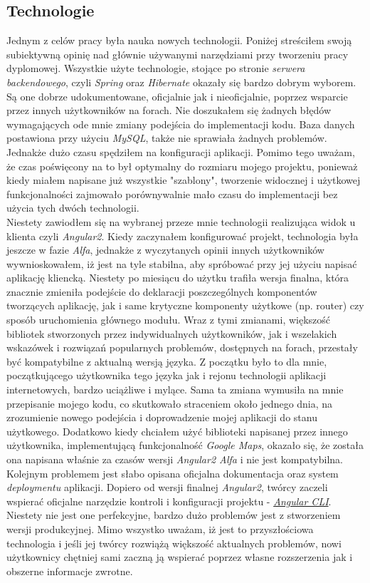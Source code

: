 \documentclass[10pt,titlepage]{article} %
\begin{document}
\subsection{Technologie}\label{Technologie}
Jednym z celów pracy była nauka nowych technologii. Poniżej streściłem swoją subiektywną opinię nad głównie używanymi narzędziami przy tworzeniu pracy dyplomowej. 
Wszystkie użyte technologie, stojące po stronie \textit{serwera backendowego}, czyli \textit{Spring} oraz \textit{Hibernate} okazały się bardzo dobrym wyborem. Są one dobrze udokumentowane, oficjalnie jak i nieoficjalnie, poprzez wsparcie przez innych użytkowników na forach. Nie doszukałem się żadnych błędów wymagających ode mnie zmiany podejścia do implementacji kodu. Baza danych postawiona przy użyciu \textit{MySQL}, także nie sprawiała żadnych problemów. Jednakże dużo czasu spędziłem na konfiguracji aplikacji. Pomimo tego uważam, że czas poświęcony na to był optymalny do rozmiaru mojego projektu, ponieważ kiedy miałem napisane już wszystkie "szablony", tworzenie widocznej i użytkowej funkcjonalności zajmowało porównywalnie mało czasu do implementacji bez użycia tych dwóch technologii. \mbox{}\\
Niestety zawiodłem się na wybranej przeze mnie technologii realizująca widok u klienta czyli \textit{Angular2}. Kiedy zaczynałem konfigurować projekt, technologia była jeszcze w fazie \textit{Alfa}, jednakże z wyczytanych opinii innych użytkowników wywnioskowałem, iż jest na tyle stabilna, aby spróbować przy jej użyciu napisać aplikację kliencką. Niestety po miesiącu do użytku trafiła wersja finalna, która znacznie zmieniła podejście do deklaracji poszczególnych komponentów tworzących aplikację, jak i same krytyczne komponenty użytkowe (np. router) czy sposób uruchomienia głównego modułu. Wraz z tymi zmianami, większość bibliotek stworzonych przez indywidualnych użytkowników, jak i wszelakich wskazówek i rozwiązań popularnych problemów, dostępnych na forach, przestały być kompatybilne z aktualną wersją języka. Z początku było to dla mnie, początkującego użytkownika tego języka jak i rejonu technologii aplikacji internetowych, bardzo uciążliwe i mylące. Sama ta zmiana wymusiła na mnie przepisanie mojego kodu, co skutkowało straceniem około jednego dnia, na zrozumienie nowego podejścia i doprowadzenie mojej aplikacji do stanu użytkowego. Dodatkowo kiedy chciałem użyć biblioteki napisanej przez innego użytkownika, implementującą funkcjonalność \textit{Google Maps}, okazało się, że została ona napisana właśnie za czasów wersji \textit{Angular2 Alfa} i nie jest kompatybilna. Kolejnym problemem jest słabo opisana oficjalna dokumentacja oraz system \textit{deploymentu} aplikacji. Dopiero od wersji finalnej \textit{Angular2}, twórcy zaczeli wspierać oficjalne narzędzie kontroli i konfiguracji projektu - \href{https://cli.angular.io/}{\textit{Angular CLI}}. Niestety nie jest one perfekcyjne, bardzo dużo problemów jest z stworzeniem wersji produkcyjnej. Mimo wszystko uważam, iż jest to przyszłościowa technologia i jeśli jej twórcy rozwiążą większość aktualnych problemów, nowi użytkownicy chętniej sami zaczną ją wspierać poprzez własne rozszerzenia jak i obszerne informacje zwrotne.
\end{document}
